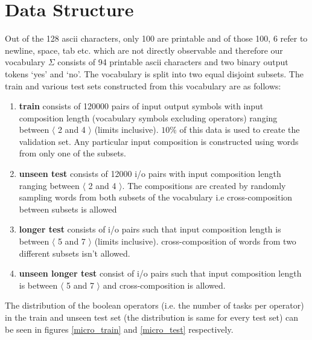 \section{Data  Structure}
Out of the 128 ascii characters, only 100 are printable and of those 100, 6 refer to newline, space, tab etc. which are not directly observable and therefore our vocabulary $\Sigma$ consists of 94 printable ascii characters and two binary output tokens \lq yes\rq{} and \lq no\rq{}. The vocabulary is split into two equal disjoint subsets. The train and various test sets constructed from this vocabulary are as follows:
\begin{enumerate}
	\item \textbf{train} consists of 120000 pairs of input output symbols with input composition length (vocabulary symbols excluding operators) ranging between $\langle$ 2 and 4 $\rangle$ (limits inclusive). $10\%$ of this data is used to create the validation set. Any particular input composition is constructed using words from only one of the subsets.
	\item \textbf{unseen test} consists of 12000 i/o pairs with input composition length ranging between $\langle$ 2 and 4 $\rangle$. The compositions are created by randomly sampling words from both subsets of the vocabulary i.e cross-composition between subsets is allowed
	\item \textbf{longer test} consists of i/o pairs such that input composition length is between $\langle$ 5 and 7 $\rangle$ (limits inclusive). cross-composition of words from two different subsets isn't allowed.
	\item \textbf{unseen longer test} consist of i/o pairs such that input composition length is between $\langle$ 5 and 7 $\rangle$ and cross-composition is allowed.
\end{enumerate}

The distribution of the boolean operators (i.e. the number of tasks per operator) in the train and unseen test set (the distribution is same for every test set) can be seen in figures \ref{micro_train} and \ref{micro_test} respectively.


